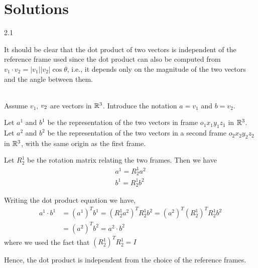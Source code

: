\chapter[Chapter 2]{Solutions}

2.1

It should be clear that the dot product of two vectors is independent of the reference frame used since the dot product can also be computed from $v_1 \cdot v_2 = |v_1| |v_2| \cos\theta$, i.e., it depends only on the magnitude of the two vectors and the angle between them.
\\~


Assume $v_1$, $v_2\space$ are vectors in $\mathbb{R}^3$. Introduce the notation $a=v_1$ and $b=v_2$.


Let $a^1$ and $b^1$ be the representation of the two vectors in frame $o_1x_1y_1z_1$ in $\mathbb{R}^3$.
Let $a^2$ and $b^2$ be the representation of the two vectors in a second frame $o_2x_2y_2z_2$ in $\mathbb{R}^3$, with the same origin as the first frame.

Let $R^1_2$ be the rotation matrix relating the two frames. Then we have 
\begin{align*} 
a^1 = R^1_2 a^2 \\ 
b^1 = R^1_2 b^2
\end{align*}

Writing the dot product equation we have, 
\begin{align*} 
a^1 \cdot b^1 &= (a^1)^T b^1 = (R^1_2 a^2)^T  R^1_2 b^2 = (a^2)^T (R^1_2)^T  R^1_2 b^2 \\
&= (a^2)^T b^2 = a^2 \cdot b^2 
\end{align*}
where we used the fact that $(R^1_2)^T  R^1_2 =I$

Hence, the dot product is independent from the choice of the reference frames.
